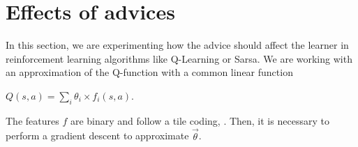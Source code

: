 \documentclass[a4paper,12pt]{article}
\begin{document}
% 
%      
% 
%     
%     
%      
%       
%       

      \newpage
      \section{Effects of advices}
      
      In this section, we are experimenting how the advice should affect the learner in reinforcement
      learning algorithms like Q-Learning or Sarsa. 
      We are working with an approximation of the Q-function with a common linear function 
      \begin{footnotesize}
       $Q(s,a) = \sum\limits_{i} \theta_{i} \times f_{i}(s,a)$.
      \end{footnotesize}
      The features $f$ are binary and follow a tile coding, \cite{ReinforceLearningIntro}.
      Then, it is necessary to perform a gradient descent to approximate $\vec\theta$.
      
\end{document}
